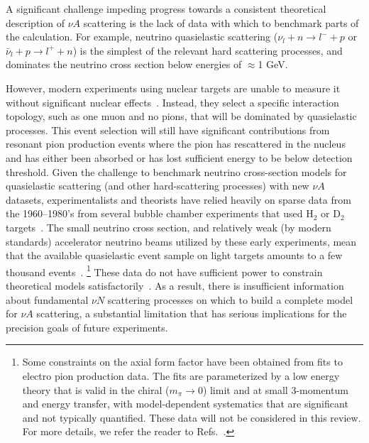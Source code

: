 \documentclass{ar-1col}
\begin{document}
A significant challenge impeding progress towards a consistent theoretical description of
$\nu A$ scattering is the lack of data with which to benchmark parts of the calculation.
For example, neutrino quasielastic scattering ($\nu_{l} + n \rightarrow l^{-} + p$ or $\bar{\nu}_{l} + p \rightarrow l^{+} + n$) is the simplest of the relevant hard scattering processes, and dominates the neutrino cross section below energies of $\approx$1 GeV.%
\begin{marginnote}
\end{marginnote}%
However, modern experiments using nuclear targets are unable to measure it without significant nuclear effects~\cite{garvey_review_2014, NuSTEC:2017hzk}.
Instead, they select a specific interaction topology, such as one muon and no pions, that will be dominated by quasielastic processes. This event selection will still have significant contributions from resonant pion production events where the pion has rescattered in the nucleus and has either been absorbed or has lost sufficient energy to be below detection threshold.
Given the challenge to benchmark neutrino cross-section models for quasielastic scattering (and other hard-scattering processes) with new $\nu A$ datasets, experimentalists and theorists have relied heavily on sparse data from the 1960--1980's from several bubble chamber experiments that used H$_{2}$ or D$_2$ targets~\cite{zeller12, ParticleDataGroup:2020ssz}.
The small neutrino cross section, and relatively weak (by modern standards) accelerator neutrino beams utilized by these early experiments, mean that the available quasielastic event sample on light targets amounts to a few thousand events~\cite{ANL_Barish_1977, BNL_Fanourakis_1980, BNL_Baker_1981, Kitagaki:1983px, Allasia:1990uy}.%
\footnote{Some constraints on the axial form factor have been obtained from fits
 to electro pion production data.
The fits are parameterized by a low energy theory that is valid in the chiral
 ($m_\pi\to0$) limit and at small 3-momentum and energy transfer,
 with model-dependent systematics that are significant and not typically quantified.
These data will not be considered in this review.
For more details, we refer the reader to Refs.~\cite{Bernard:1993bq,Bernard:2001rs}.
}
These data do not have sufficient power to constrain theoretical models satisfactorily~\cite{Meyer:2016oeg, Hill:2017wgb}. As a result, there is insufficient information about fundamental $\nu N$ scattering processes on which to build a complete model for $\nu A$ scattering, a substantial limitation that has serious implications for the precision goals of future experiments.
\end{document}
